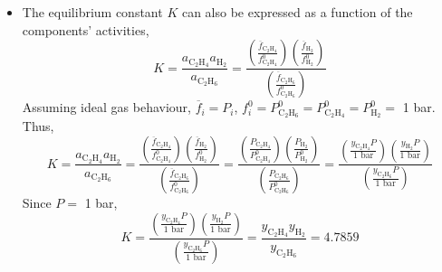 \documentclass[12pts,a4paper,amsmath,amssymb,floatfix]{article}%
\newcommand{\frc}{\displaystyle\frac}
\begin{document}
\begin{enumerate}[1)]
\begin{itemize}
      \item The equilibrium constant $K$ can also be expressed as a function of the components' activities,
         \begin{displaymath}
            K = \frc{a_{\text{C}_{2}\text{H}_{4}}a_{\text{H}_{2}}}{a_{\text{C}_{2}\text{H}_{6}}} = \frc{\left(\frc{\overline{f}_{\text{C}_{2}\text{H}_{4}}}{f^{0}_{\text{C}_{2}\text{H}_{4}}}\right)\left(\frc{\overline{f}_{\text{H}_{2}}}{f^{0}_{\text{H}_{2}}}\right)}{\left(\frc{\overline{f}_{\text{C}_{2}\text{H}_{6}}}{f^{0}_{\text{C}_{2}\text{H}_{6}}}\right)}
         \end{displaymath}
         Assuming ideal gas behaviour, $\overline{f}_{i}=P_{i}$, $f_{i}^{0}=P^{0}_{\text{C}_{2}\text{H}_{6}}=P^{0}_{\text{C}_{2}\text{H}_{4}}=P^{0}_{\text{H}_{2}}=$ 1 bar. Thus,
         \begin{displaymath}
            K = \frc{a_{\text{C}_{2}\text{H}_{4}}a_{\text{H}_{2}}}{a_{\text{C}_{2}\text{H}_{6}}} = \frc{\left(\frc{\overline{f}_{\text{C}_{2}\text{H}_{4}}}{f^{0}_{\text{C}_{2}\text{H}_{4}}}\right)\left(\frc{\overline{f}_{\text{H}_{2}}}{f^{0}_{\text{H}_{2}}}\right)}{\left(\frc{\overline{f}_{\text{C}_{2}\text{H}_{6}}}{f^{0}_{\text{C}_{2}\text{H}_{6}}}\right)} = \frc{\left(\frc{P_{\text{C}_{2}\text{H}_{4}}}{P^{0}_{\text{C}_{2}\text{H}_{4}}}\right)\left(\frc{P_{\text{H}_{2}}}{P^{0}_{\text{H}_{2}}}\right)}{\left(\frc{P_{\text{C}_{2}\text{H}_{6}}}{P^{0}_{\text{C}_{2}\text{H}_{6}}}\right)} = \frc{\left(\frc{y_{\text{C}_{2}\text{H}_{4}}P}{1\text{ bar}}\right)\left(\frc{y_{\text{H}_{2}}P}{1\text{ bar}}\right)}{\left(\frc{y_{\text{C}_{2}\text{H}_{6}}P}{1\text{ bar}}\right)}          
         \end{displaymath}
         Since $P=$ 1 bar,
         \begin{displaymath}
            K = \frc{\left(\frc{y_{\text{C}_{2}\text{H}_{4}}P}{1\text{ bar}}\right)\left(\frc{y_{\text{H}_{2}}P}{1\text{ bar}}\right)}{\left(\frc{y_{\text{C}_{2}\text{H}_{6}}P}{1\text{ bar}}\right)} = \frc{y_{\text{C}_{2}\text{H}_{4}} y_{\text{H}_{2}}}{y_{\text{C}_{2}\text{H}_{6}}} = 4.7859
         \end{displaymath}


\end{itemize}
\end{enumerate}
\end{document}
